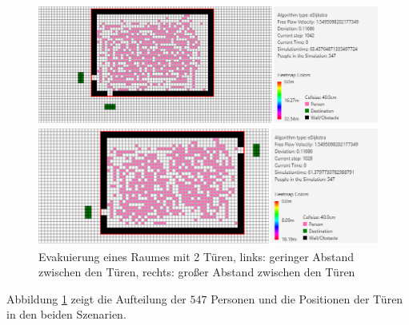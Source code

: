 \begin{figure}[!htb]
	\centering
	\begin{minipage}{.5\textwidth}
		\centering
		\includegraphics[width=\textwidth]{abbildungen/Evak2TMinDis2.png}
	\end{minipage}%
	\begin{minipage}{0.5\textwidth}
		\centering
		\includegraphics[width=\textwidth]{abbildungen/Evak2TMaxDis2.png}
	\end{minipage}
	\caption{Evakuierung eines Raumes mit 2 Türen, links: geringer Abstand zwischen den Türen, rechts: großer Abstand zwischen den Türen}
	\label{fig:Evak2TminmaxDis2}
\end{figure}

Abbildung \ref{fig:Evak2TminmaxDis2} zeigt die Aufteilung der $547$ Personen und die Positionen der Türen in den beiden Szenarien. 

